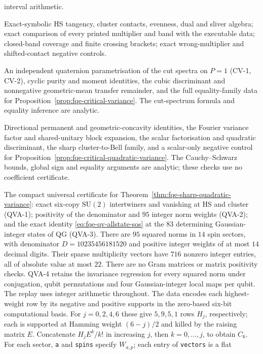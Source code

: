 \begin{description}
interval arithmetic.
\item[DA-1--DA-5] Exact-symbolic HS tangency, cluster contacts, evenness,
dual and sliver algebra; exact comparison of every printed multiplier and band with the
executable data; closed-band coverage and finite crossing brackets; exact wrong-multiplier
and shifted-contact negative controls.
\item[CV-1--CV-5] An independent quaternion parametrisation of the cut spectra on $P=1$ (CV-1, CV-2), cyclic purity and moment
identities, the cubic discriminant and nonnegative geometric-mean transfer remainder, and the full equality-family data for Proposition~\ref{prop:fqe-critical-variance}.
The cut-spectrum formula and equality inference are analytic.
\item[CJ-1--CJ-5] Directional permanent and geometric-concavity identities,
the Fourier variance factor and shared-unitary block expansion, the scalar
factorisation and quadratic discriminant, the sharp cluster-to-Bell family,
and a scalar-only negative control for
Proposition~\ref{prop:fqe-critical-quadratic-variance}.
The Cauchy--Schwarz bounds, global sign and equality arguments are analytic;
these checks use no coefficient certificate.
\item[QVA-1--QVA-4] The compact universal certificate for Theorem~\ref{thm:fqe-sharp-quadratic-variance}:
exact six-copy $\mathrm{SU}(2)$ intertwiners and vanishing at HS and cluster (QVA-1);
positivity of the denominator and $95$ integer norm weights (QVA-2); and the exact identity
\eqref{eq:fqe-qv-allstate-sos} at the $83$ determining Gaussian-integer states of QG (QVA-3).
There are $95$ squared norms in $14$ spin sectors, with denominator $D=10235456181520$ and positive integer
weights of at most $14$ decimal digits. Their sparse multiplicity vectors have $716$ nonzero integer entries,
all of absolute value at most $22$. There are no Gram matrices or matrix positivity checks.
QVA-4 retains the invariance regression for every squared norm under conjugation, qubit permutations and four
Gaussian-integer local maps per qubit. The replay uses integer arithmetic throughout.
The data encodes each highest-weight row by its negative and positive supports in the zero-based
six-bit computational basis. For $j=0,2,4,6$ these give $5,9,5,1$ rows $H_j$, respectively;
each is supported at Hamming weight $(6-j)/2$ and killed by the raising matrix $E$.
Concatenate $H_jE^k/k!$ in increasing $j$, then $k=0,\ldots,j$, to obtain $C_6$.
For each sector, \texttt{a} and \texttt{spins} specify $W_{a,p}$; each entry of \texttt{vectors} is a flat

\end{description}
